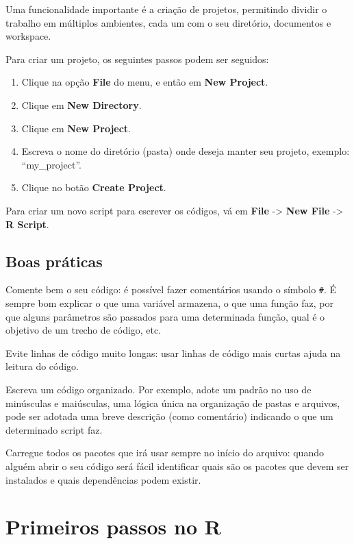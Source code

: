 \documentclass[
  letterpaper,
  DIV=11,
  numbers=noendperiod]{scrreprt}
\begin{document}
Uma funcionalidade importante é a criação de projetos, permitindo
dividir o trabalho em múltiplos ambientes, cada um com o seu diretório,
documentos e workspace.

Para criar um projeto, os seguintes passos podem ser seguidos:

\begin{enumerate}
\def\labelenumi{\arabic{enumi})}
\item
  Clique na opção \textbf{File} do menu, e então em \textbf{New
  Project}.
\item
  Clique em \textbf{New Directory}.
\item
  Clique em \textbf{New Project}.
\item
  Escreva o nome do diretório (pasta) onde deseja manter seu projeto,
  exemplo: ``my\_project''.
\item
  Clique no botão \textbf{Create Project}.
\end{enumerate}

Para criar um novo script para escrever os códigos, vá em \textbf{File}
-\textgreater{} \textbf{New File} -\textgreater{} \textbf{R Script}.

\hypertarget{boas-pruxe1ticas}{%
\subsection{Boas práticas}\label{boas-pruxe1ticas}}

Comente bem o seu código: é possível fazer comentários usando o símbolo
\texttt{\#}. É sempre bom explicar o que uma variável armazena, o que
uma função faz, por que alguns parâmetros são passados para uma
determinada função, qual é o objetivo de um trecho de código, etc.

Evite linhas de código muito longas: usar linhas de código mais curtas
ajuda na leitura do código.

Escreva um código organizado. Por exemplo, adote um padrão no uso de
minúsculas e maiúsculas, uma lógica única na organização de pastas e
arquivos, pode ser adotada uma breve descrição (como comentário)
indicando o que um determinado script faz.

Carregue todos os pacotes que irá usar sempre no início do arquivo:
quando alguém abrir o seu código será fácil identificar quais são os
pacotes que devem ser instalados e quais dependências podem existir.

\hypertarget{primeiros-passos-no-r}{%
\section{Primeiros passos no R}\label{primeiros-passos-no-r}}
\end{document}
